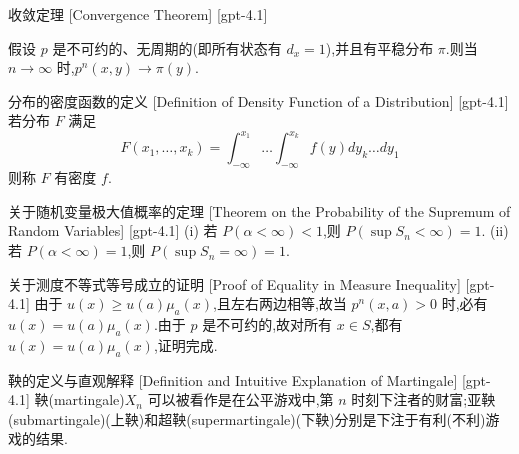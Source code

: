 \documentclass[UTF8]{ctexart}
\begin{document}
    
    
    \begin{thm}
        {收敛定理}
        [Convergence Theorem]
        [gpt-4.1]
        
假设 $p$ 是不可约的、无周期的(即所有状态有 $d_{x} = 1$),并且有平稳分布 $\pi$.则当 $n \to \infty$ 时,$p^{n}(x, y) \to \pi(y)$.

    \end{thm}
    
    
    
    \begin{dfn}
        {分布的密度函数的定义}
        [Definition of Density Function of a Distribution]
        [gpt-4.1]
        若分布 $F$ 满足
\[
F ( x _ { 1 } , \dots , x _ { k } ) = \int _ { - \infty } ^ { x _ { 1 } } \dots \int _ { - \infty } ^ { x _ { k } } f ( y ) d y _ { k } \dots d y _ { 1 }
\]
则称 $F$ 有密度 $f$.
    \end{dfn}
    
    
    
    \begin{thm}
        {关于随机变量极大值概率的定理}
        [Theorem on the Probability of the Supremum of Random Variables]
        [gpt-4.1]
        (i) 若 $P(\alpha < \infty) < 1$,则 $P(\sup S_{n} < \infty) = 1$.
(ii) 若 $P(\alpha < \infty) = 1$,则 $P(\sup S_{n} = \infty) = 1$.
    \end{thm}
    
    
    
    \begin{prf}
        {关于测度不等式等号成立的证明}
        [Proof of Equality in Measure Inequality]
        [gpt-4.1]
        由于 $
u ( x ) \geq 
u ( a ) \mu _ { a } ( x )$,且左右两边相等,故当 $p ^ { n } ( x , a ) > 0$ 时,必有 $
u ( x ) = 
u ( a ) \mu _ { a } ( x )$.由于 $p$ 是不可约的,故对所有 $x \in S$,都有 $
u ( x ) = 
u ( a ) \mu _ { a } ( x )$,证明完成.
    \end{prf}
    
    
    
    \begin{dfn}
        {鞅的定义与直观解释}
        [Definition and Intuitive Explanation of Martingale]
        [gpt-4.1]
        鞅(martingale)$X_n$ 可以被看作是在公平游戏中,第 $n$ 时刻下注者的财富;亚鞅(submartingale)(上鞅)和超鞅(supermartingale)(下鞅)分别是下注于有利(不利)游戏的结果.
    \end{dfn}
    
\end{document}
